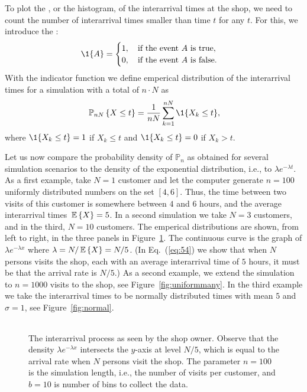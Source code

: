 To plot the , or the
histogram, of the interarrival times at the shop, we need to count the
number of interarrival times smaller than time $t$ for any $t$.  For
this, we introduce the :
\begin{equation*}
  \1{A} =
  \begin{cases}
    1, \quad\text{if the event $A$ is true},\\
    0, \quad\text{if the event $A$ is false}.
  \end{cases}
\end{equation*}
With the indicator function we define emperical distribution of the
interarrival times for a simulation with a total of $n\cdot N$ as
\begin{equation*}
  \PP{nN}{X \leq t} = \frac1{nN}\sum_{k=1}^{nN} \1{X_k\leq t},
\end{equation*}
where $\1{X_k\leq t}=1$ if $X_k\leq t$ and $\1{X_k\leq t}=0$
if $X_k> t$.  

Let us now compare the probability density of $\mathbb{P}_n$ as
obtained for several simulation scenarios to the density of the
exponential distribution, i.e., to $\lambda e^{-\lambda t}$.  As a
first example, take $N=1$ customer and let the computer generate
$n=100$ uniformly distributed numbers on the set $[4, 6]$.  Thus, the
time between two visits of this customer is somewhere between $4$ and
$6$ hours, and the average interarrival times $\,\mathbb{E}\left\{X\right\} = 5$. In a second
simulation we take $N=3$ customers, and in the third, $N=10$
customers. The emperical distributions are shown, from left to right,
in the three panels in Figure~\ref{fig:uniformfew}. The continuous
curve is the graph of $\lambda e^{-\lambda x}$ where
$\lambda = N/\,\mathbb{E}\left\{X\right\} = N/5$. (In Eq.~(\ref{eq:54}) we show that when $N$
persons visits the shop, each with an average interarrival time of $5$
hours, it must be that the arrival rate is $N/5$.)  As a second
example, we extend the simulation to $n=1000$ visits to the shop, see
Figure~\ref{fig:uniformmany}. In the third example we take the
interarrival times to be normally distributed times with mean $5$ and
$\sigma=1$, see Figure~\ref{fig:normal}.

\begin{figure}[ht]
  \centering
  \begin{tabular}[h]{c}
 \\
  \end{tabular}
  \caption{The interarrival process as seen by the shop owner. Observe
    that the density $\lambda e^{-\lambda x}$ intersects the $y$-axis
    at level $N/5$, which is equal to the arrival rate when $N$
    persons visit the shop. The parameter $n=100$ is the simulation
    length, i.e., the number of visits per customer, and $b=10$ is
    number of bins to collect the data.}
  \label{fig:uniformfew}
\end{figure}

